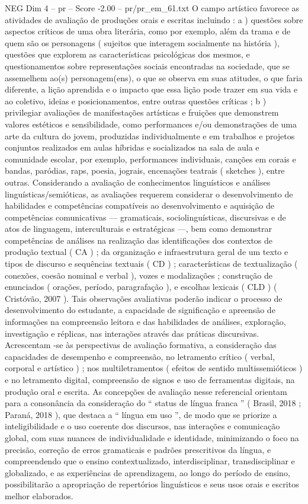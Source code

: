 \begin{textsample}{NEG Dim 4 – pr – Score -2.00 – pr/pr\_em\_61.txt}
O campo artístico favorece as atividades de avaliação de produções orais e escritas incluindo : a ) questões sobre aspectos críticos de uma obra literária, como por exemplo, além da trama e de quem são os personagens ( sujeitos que interagem socialmente na história ), questões que explorem as características psicológicas dos mesmos, e questionamentos sobre representações sociais encontradas na sociedade, que se assemelhem ao(s) personagem(ens), o que se observa em suas atitudes, o que faria diferente, a lição aprendida e o impacto que essa lição pode trazer em sua vida e ao coletivo, ideias e posicionamentos, entre outras questões críticas ; b ) privilegiar avaliações de manifestações artísticas e fruições que demonstrem valores estéticos e sensibilidade, como performances e/ou demonstrações de uma arte da cultura do jovem, produzidas individualmente e em trabalhos e projetos conjuntos realizados em aulas híbridas e socializados na sala de aula e comunidade escolar, por exemplo, performances individuais, canções em corais e bandas, paródias, raps, poesia, jograis, encenações teatrais ( sketches ), entre outras.
Considerando a avaliação de conhecimentos linguísticos e análises linguísticas/semióticas, as avaliações requerem considerar o desenvolvimento de habilidades e competências compatíveis ao desenvolvimento e aquisição de competências comunicativas — gramaticais, sociolinguísticas, discursivas e de atos de linguagem, interculturais e estratégicas —, bem como demonstrar competências de análises na realização das identificações dos contextos de produção textual ( CA ) ; da organização e infraestrutura geral de um texto e tipos de discurso e sequências textuais ( CD ) ; características de textualização ( conexões, coesão nominal e verbal ), vozes e modalizações ; construção de enunciados ( orações, período, paragrafação ), e escolhas lexicais ( CLD ) ( Cristóvão, 2007 ).
Tais observações avaliativas poderão indicar o processo de desenvolvimento do estudante, a capacidade de significação e apreensão de informações na compreensão leitora e das habilidades de análises, exploração, investigação e réplicas, nas interações através das práticas discursivas.
Acrescentam -se às perspectivas de avaliação formativa, a consideração das capacidades de desempenho e compreensão, no letramento crítico ( verbal, corporal e artístico ) ; nos multiletramentos ( efeitos de sentido multissemióticos ) e no letramento digital, compreensão de signos e uso de ferramentas digitais, na produção oral e escrita.
As concepções de avaliação nesse referencial orientam para a consonância da consideração do “ status de língua franca ” ( Brasil, 2018 ; Paraná, 2018 ), que destaca a “ língua em uso ”, de modo que se priorize a inteligibilidade e o uso coerente dos discursos, nas interações e comunicação global, com suas nuances de individualidade e identidade, minimizando o foco na precisão, correção de erros gramaticais e padrões prescritivos da língua, e compreendendo que o ensino contextualizado, interdisciplinar, transdisciplinar e globalizado, e as experiências de aprendizagem, ao longo do período de ensino, possibilitarão a apropriação de repertórios linguísticos e seus usos orais e escritos melhor elaborados.

\end{textsample}
